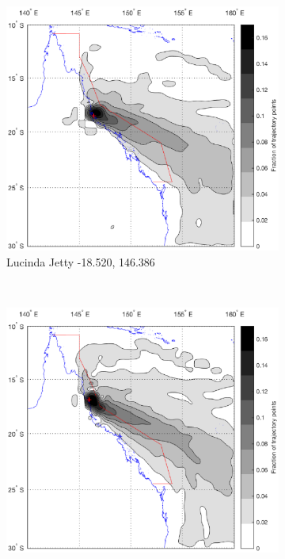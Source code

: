 \begin{figure}[!t]
    \begin{subfigure}[b]{0.45\textwidth}
	    \includegraphics[width=\textwidth]{Fig/Research/BT_Coast/Map_105.eps}
	    \caption{Lucinda Jetty -18.520, 146.386}
	    \label{subfig:cair}
    \end{subfigure}
    ~
    \begin{subfigure}[b]{0.45\textwidth}
	    \includegraphics[width=\textwidth]{Fig/Research/BT_Coast/Map_106.eps}

\end{subfigure}
\end{figure}
